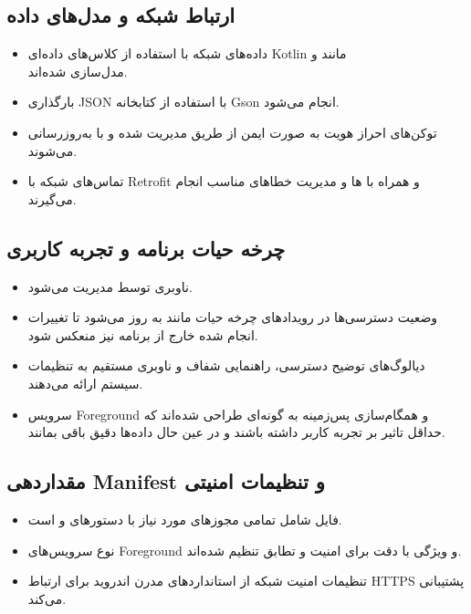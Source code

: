 \subsection{ارتباط شبکه و مدل‌های داده}
\begin{itemize}
    \item داده‌های شبکه با استفاده از کلاس‌های داده‌ای Kotlin مانند  و \\ مدل‌سازی شده‌اند.
    \item بارگذاری JSON با استفاده از کتابخانه Gson انجام می‌شود.
    \item توکن‌های احراز هویت به صورت ایمن از طریق  مدیریت شده و با  به‌روزرسانی می‌شوند.
    \item تماس‌های شبکه با Retrofit و همراه با  ها و مدیریت خطاهای مناسب انجام می‌گیرند.
\end{itemize}

\subsection{چرخه حیات برنامه و تجربه کاربری}
\begin{itemize}
    \item ناوبری توسط  مدیریت می‌شود.
    \item وضعیت دسترسی‌ها در رویدادهای چرخه حیات مانند  به روز می‌شود تا تغییرات انجام شده خارج از برنامه نیز منعکس شود.
    \item دیالوگ‌های توضیح دسترسی، راهنمایی شفاف و ناوبری مستقیم به تنظیمات سیستم ارائه می‌دهند.
    \item سرویس Foreground و همگام‌سازی پس‌زمینه به گونه‌ای طراحی شده‌اند که حداقل تاثیر بر تجربه کاربر داشته باشند و در عین حال داده‌ها دقیق باقی بمانند.
\end{itemize}

\subsection{مقداردهی Manifest و تنظیمات امنیتی}
\begin{itemize}
    \item فایل  شامل تمامی مجوزهای مورد نیاز با دستورهای  و  است.
    \item نوع سرویس‌های Foreground و ویژگی  با دقت برای امنیت و تطابق تنظیم شده‌اند.
    \item تنظیمات امنیت شبکه از استانداردهای مدرن اندروید برای ارتباط HTTPS پشتیبانی می‌کند.
\end{itemize}

